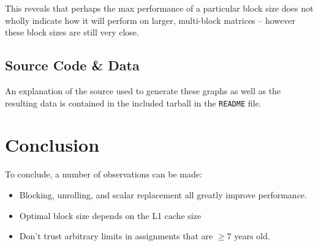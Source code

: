 \documentclass{article}
\begin{document}
This reveals that perhaps the max performance of a particular block size does not wholly indicate how it will perform on larger, multi-block matrices -- however these block sizes are still very close.
\subsection{Source Code \& Data}
An explanation of the source used to generate these graphs as well as the resulting data is contained in the included tarball in the \texttt{README} file.

\section{Conclusion}
To conclude, a number of observations can be made: 
\begin{itemize}
    \item Blocking, unrolling, and scalar replacement all greatly improve performance.
    \item Optimal block size depends on the L1 cache size 
    \item Don't trust arbitrary limits in assignments that are $\geq7$ years old.
\end{itemize}
\end{document}
